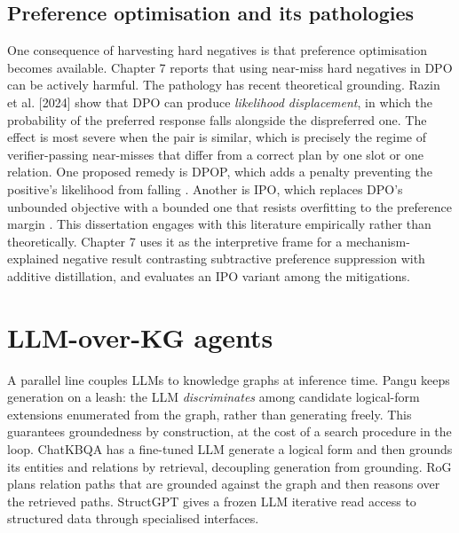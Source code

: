 \documentclass[10pt]{article} %
\begin{document}
\subsection{Preference optimisation and its pathologies}\label{sec:preference-optimisation-and-its-patholog}

One consequence of harvesting hard negatives is that preference optimisation becomes available. Chapter 7 reports that using near-miss hard negatives in DPO \citep{rafailov2023dpo} can be actively harmful. The pathology has recent theoretical grounding. Razin et al. [2024] show that DPO can produce \emph{likelihood displacement}, in which the probability of the preferred response falls alongside the dispreferred one. The effect is most severe when the pair is similar, which is precisely the regime of verifier-passing near-misses that differ from a correct plan by one slot or one relation. One proposed remedy is DPOP, which adds a penalty preventing the positive's likelihood from falling \citep{pal2024smaug}. Another is IPO, which replaces DPO's unbounded objective with a bounded one that resists overfitting to the preference margin \citep{azar2024ipo}. This dissertation engages with this literature empirically rather than theoretically. Chapter 7 uses it as the interpretive frame for a mechanism-explained negative result contrasting subtractive preference suppression with additive distillation, and evaluates an IPO variant among the mitigations.

\section{LLM-over-KG agents}\label{sec:llm-over-kg-agents}

A parallel line couples LLMs to knowledge graphs at inference time. Pangu \citep{gu2023pangu} keeps generation on a leash: the LLM \emph{discriminates} among candidate logical-form extensions enumerated from the graph, rather than generating freely. This guarantees groundedness by construction, at the cost of a search procedure in the loop. ChatKBQA \citep{luo2024chatkbqa} has a fine-tuned LLM generate a logical form and then grounds its entities and relations by retrieval, decoupling generation from grounding. RoG \citep{luo2024rog} plans relation paths that are grounded against the graph and then reasons over the retrieved paths. StructGPT \citep{jiang2023structgpt} gives a frozen LLM iterative read access to structured data through specialised interfaces.
\end{document}

